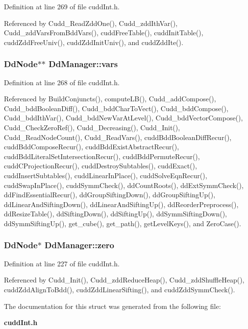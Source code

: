 Definition at line 269 of file cudd\-Int.h.

Referenced by Cudd\_\-Read\-Zdd\-One(), Cudd\_\-zdd\-Ith\-Var(), Cudd\_\-zdd\-Vars\-From\-Bdd\-Vars(), cudd\-Free\-Table(), cudd\-Init\-Table(), cudd\-Zdd\-Free\-Univ(), cudd\-Zdd\-Init\-Univ(), and cudd\-Zdd\-Ite().
\subsubsection{\setlength{\rightskip}{0pt plus 5cm}\bf{Dd\-Node}$\ast$$\ast$ \bf{Dd\-Manager::vars}}\label{structDdManager_70f75f877a9e8f1b7a1c219cd4675ce1}




Definition at line 268 of file cudd\-Int.h.

Referenced by Build\-Conjuncts(), compute\-LB(), Cudd\_\-add\-Compose(), Cudd\_\-bdd\-Boolean\-Diff(), Cudd\_\-bdd\-Char\-To\-Vect(), Cudd\_\-bdd\-Compose(), Cudd\_\-bdd\-Ith\-Var(), Cudd\_\-bdd\-New\-Var\-At\-Level(), Cudd\_\-bdd\-Vector\-Compose(), Cudd\_\-Check\-Zero\-Ref(), Cudd\_\-Decreasing(), Cudd\_\-Init(), Cudd\_\-Read\-Node\-Count(), Cudd\_\-Read\-Vars(), cudd\-Bdd\-Boolean\-Diff\-Recur(), cudd\-Bdd\-Compose\-Recur(), cudd\-Bdd\-Exist\-Abstract\-Recur(), cudd\-Bdd\-Literal\-Set\-Intersection\-Recur(), cudd\-Bdd\-Permute\-Recur(), cudd\-CProjection\-Recur(), cudd\-Destroy\-Subtables(), cudd\-Exact(), cudd\-Insert\-Subtables(), cudd\-Linear\-In\-Place(), cudd\-Solve\-Eqn\-Recur(), cudd\-Swap\-In\-Place(), cudd\-Symm\-Check(), dd\-Count\-Roots(), dd\-Ext\-Symm\-Check(), dd\-Find\-Essential\-Recur(), dd\-Group\-Sifting\-Down(), dd\-Group\-Sifting\-Up(), dd\-Linear\-And\-Sifting\-Down(), dd\-Linear\-And\-Sifting\-Up(), dd\-Reorder\-Preprocess(), dd\-Resize\-Table(), dd\-Sifting\-Down(), dd\-Sifting\-Up(), dd\-Symm\-Sifting\-Down(), dd\-Symm\-Sifting\-Up(), get\_\-cube(), get\_\-path(), get\-Level\-Keys(), and Zero\-Case().
\subsubsection{\setlength{\rightskip}{0pt plus 5cm}\bf{Dd\-Node}$\ast$ \bf{Dd\-Manager::zero}}\label{structDdManager_cad9c199ad43af1a2c837ef5be30d01d}




Definition at line 227 of file cudd\-Int.h.

Referenced by Cudd\_\-Init(), Cudd\_\-zdd\-Reduce\-Heap(), Cudd\_\-zdd\-Shuffle\-Heap(), cudd\-Zdd\-Align\-To\-Bdd(), cudd\-Zdd\-Linear\-Sifting(), and cudd\-Zdd\-Symm\-Check().

The documentation for this struct was generated from the following file:\begin{CompactItemize}
\item 
\bf{cudd\-Int.h}\end{CompactItemize}
